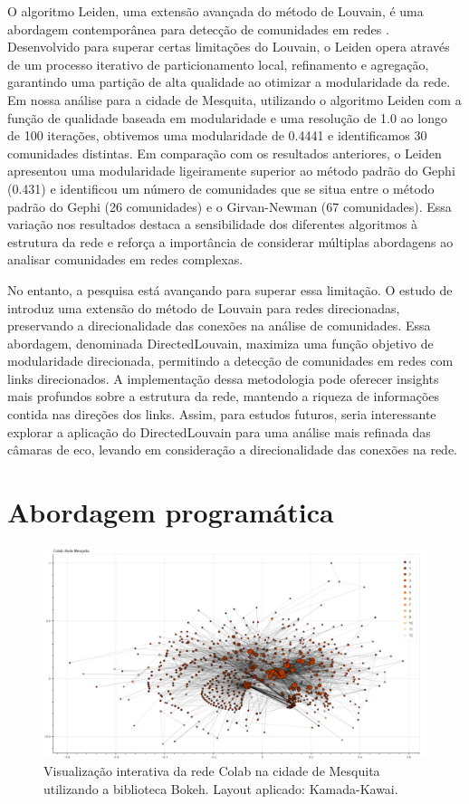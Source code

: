 O algoritmo Leiden, uma extensão avançada do método de Louvain, é uma abordagem contemporânea para detecção de comunidades em redes \cite{2018_Traag}. Desenvolvido para superar certas limitações do Louvain, o Leiden opera através de um processo iterativo de particionamento local, refinamento e agregação, garantindo uma partição de alta qualidade ao otimizar a modularidade da rede. Em nossa análise para a cidade de Mesquita, utilizando o algoritmo Leiden com a função de qualidade baseada em modularidade e uma resolução de 1.0 ao longo de 100 iterações, obtivemos uma modularidade de 0.4441 e identificamos 30 comunidades distintas. Em comparação com os resultados anteriores, o Leiden apresentou uma modularidade ligeiramente superior ao método padrão do Gephi (0.431) e identificou um número de comunidades que se situa entre o método padrão do Gephi (26 comunidades) e o Girvan-Newman (67 comunidades). Essa variação nos resultados destaca a sensibilidade dos diferentes algoritmos à estrutura da rede e reforça a importância de considerar múltiplas abordagens ao analisar comunidades em redes complexas.

No entanto, a pesquisa está avançando para superar essa limitação. O estudo de  introduz uma extensão do método de Louvain para redes direcionadas, preservando a direcionalidade das conexões na análise de comunidades. Essa abordagem, denominada DirectedLouvain, maximiza uma função objetivo de modularidade direcionada, permitindo a detecção de comunidades em redes com links direcionados. A implementação dessa metodologia pode oferecer insights mais profundos sobre a estrutura da rede, mantendo a riqueza de informações contida nas direções dos links. Assim, para estudos futuros, seria interessante explorar a aplicação do DirectedLouvain para uma análise mais refinada das câmaras de eco, levando em consideração a direcionalidade das conexões na rede.

\section{Abordagem programática}

\begin{figure}[h]
    \centering
    \includegraphics[scale=0.30]{images/bokeh_plot.png}
    \caption{Visualização interativa da rede Colab na cidade de Mesquita utilizando a biblioteca Bokeh. Layout aplicado: Kamada-Kawai.}
    \label{fig:bokeh_plot}
	\fautor
\end{figure}

